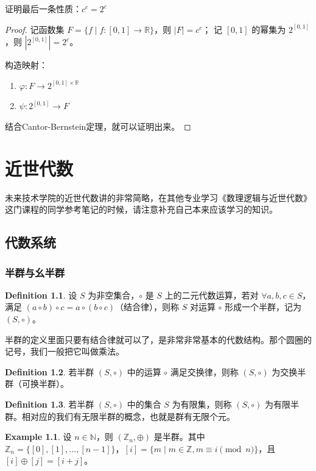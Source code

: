 \documentclass[oneside]{book}
\theoremstyle{definition}
\newtheorem{example}{Example}[section]
\newtheorem{definition}{Definition}[section]
\begin{document}
证明最后一条性质：\(c^c = 2^c\)
\begin{proof}
	记函数集 \( F = \{ f \mid f: [0,1] \to \mathbb{R} \} \)，则 \( |F| = c^c \)；
	记 \( [0,1] \) 的幂集为 \( 2^{[0,1]} \)，则 \( |2^{[0,1]}| = 2^c \)。
	
	构造映射：
	\begin{enumerate}
		\item \( \varphi: F \to 2^{[0,1] \times \mathbb{R}} \)
		\item \( \psi: 2^{[0,1]} \to F \)
	\end{enumerate}
	结合Cantor-Bernstein定理，就可以证明出来。
\end{proof}
\part{近世代数}
未来技术学院的近世代数讲的非常简略，在其他专业学习《数理逻辑与近世代数》这门课程的同学参考笔记的时候，请注意补充自己本来应该学习的知识。
\chapter{代数系统}

\section{半群与幺半群}

\begin{definition}
	设 \( S \) 为非空集合，\( \circ \) 是 \( S \) 上的二元代数运算，若对 \( \forall a, b, c \in S \)，满足 \( (a \circ b) \circ c = a \circ (b \circ c) \)（结合律），则称 \( S \) 对运算 \( \circ \) 形成一个半群，记为 \( (S, \circ) \)。
\end{definition}
半群的定义里面只要有结合律就可以了，是非常非常基本的代数结构。那个圆圈的记号，我们一般把它叫做乘法。
\begin{definition}
	若半群 \( (S, \circ) \) 中的运算 \( \circ \) 满足交换律，则称 \( (S, \circ) \) 为交换半群（可换半群）。
\end{definition}

\begin{definition}
	若半群 \( (S, \circ) \) 中的集合 \( S \) 为有限集，则称 \( (S, \circ) \) 为有限半群。相对应的我们有无限半群的概念，也就是群有无限个元。
\end{definition}

\begin{example}
	设 \( n \in \mathbb{N} \)，则 \( (\mathbb{Z}_n, \oplus) \) 是半群。其中 \( \mathbb{Z}_n = \{[0], [1], \dots, [n-1]\} \)，\( [i] = \{m \mid m \in \mathbb{Z}, m \equiv i \pmod{n}\} \)，且 \( [i] \oplus [j] = [i+j] \)。
\end{example}
\end{document}

